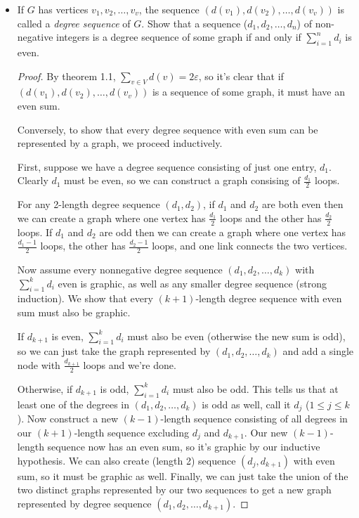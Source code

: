\documentclass[11pt]{article}
\newcommand\itm[1]{\item[\textbf{#1}]}
\newcommand{\n}{\vspace{0.5cm}}
\begin{document}
\begin{itemize}
\begin{proof}
        In conclusion, for any \(k\)-cube, two vertices cannot be adjacent to the same 3 vertices, meaning that the above bipartite graph cannot be a subgraph of any \(k\)-cube.
      \end{proof}



  \itm{1.5.5} If \(G\) has vertices \(v_1, v_2, \hdots, v_v\), the sequence \((d(v_1), d(v_2), \hdots, d(v_v))\) is called a \textit{degree sequence} of \(G\).  Show that a sequence (\(d_1, d_2, \hdots, d_n\)) of non-negative integers is a degree sequence of some graph if and only if \(\displaystyle \sum_{i=1}^n d_i\) is even.
    \begin{proof}
      By theorem 1.1, \(\displaystyle\sum_{v \in V} d(v) = 2\varepsilon\), so it's clear that if \((d(v_1), d(v_2), \hdots, d(v_v))\) is a sequence of some graph, it must have an even sum. \n

      Conversely, to show that every degree sequence with even sum can be represented by a graph, we proceed inductively.

      First, suppose we have a degree sequence consisting of just one entry, \(d_1\).  Clearly \(d_1\) must be even, so we can construct a graph consising of \(\displaystyle\frac{d_1}{2}\) loops.

      For any 2-length degree sequence \((d_1,d_2)\), if \(d_1\) and \(d_2\) are both even then we can create a graph where one vertex has \(\displaystyle\frac{d_1}{2}\) loops and the other has \(\displaystyle\frac{d_2}{2}\) loops.  If \(d_1\) and \(d_2\) are odd then we can create a graph where one vertex has \(\displaystyle\frac{d_1-1}{2}\) loops, the other has \(\displaystyle\frac{d_2-1}{2}\) loops, and one link connects the two vertices.

      Now assume every nonnegative degree sequence \((d_1,d_2,\hdots,d_k)\) with \(\displaystyle\sum_{i=1}^{k}d_i\) even is graphic, as well as any smaller degree sequence (strong induction).  We show that every \((k+1)\)-length degree sequence with even sum must also be graphic.

      If \(d_{k+1}\) is even, \(\displaystyle\sum_{i=1}^{k}d_i\) must also be even (otherwise the new sum is odd), so we can just take the graph represented by \((d_1,d_2,\hdots,d_k)\) and add a single node with \(\displaystyle\frac{d_{k+1}}{2}\) loops and we're done.

      Otherwise, if \(d_{k+1}\) is odd, \(\displaystyle\sum_{i=1}^{k}d_i\) must also be odd.  This tells us that at least one of the degrees in \((d_1,d_2,\hdots,d_k)\) is odd as well, call it \(d_j\) (\(1 \leq j \leq k\)).  Now construct a new \((k-1)\)-length sequence consisting of all degrees in our \((k+1)\)-length sequence excluding \(d_j\) and \(d_{k+1}\).  Our new \((k-1)\)-length sequence now has an even sum, so it's graphic by our inductive hypothesis.  We can also create (length 2) sequence \((d_j, d_{k+1})\) with even sum, so it must be graphic as well.  Finally, we can just take the union of the two distinct graphs represented by our two sequences to get a new graph represented by degree sequence \((d_1,d_2,\hdots,d_{k+1})\). \n


\end{proof}
\end{itemize}
\end{document}
